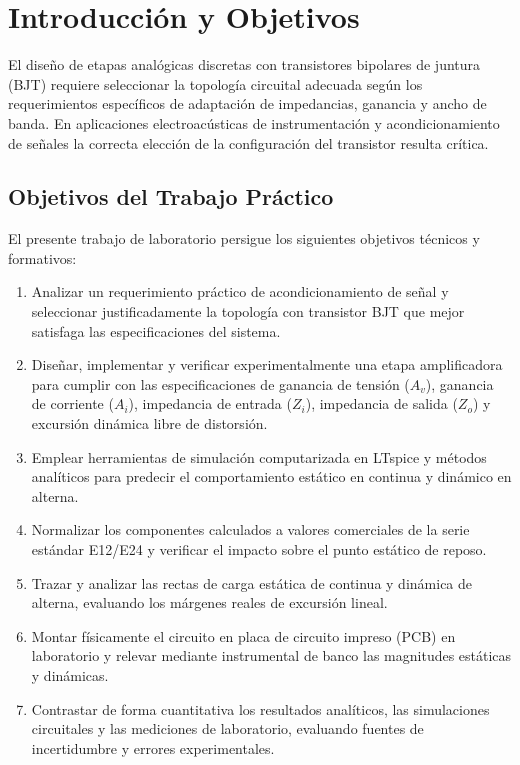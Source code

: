 \chapter{Introducción y Objetivos}
\label{chap:introduccion}
El diseño de etapas analógicas discretas con transistores bipolares de juntura (BJT) requiere seleccionar la
topología circuital adecuada según los requerimientos específicos de adaptación de impedancias, ganancia y
ancho de banda. En aplicaciones electroacústicas de instrumentación y acondicionamiento de señales la correcta elección de la configuración del transistor resulta crítica.

\section{Objetivos del Trabajo Práctico}

El presente trabajo de laboratorio persigue los siguientes objetivos técnicos y formativos:
\begin{enumerate}
  \item Analizar un requerimiento práctico de acondicionamiento de señal y seleccionar justificadamente la
    topología con transistor BJT que mejor satisfaga las especificaciones del sistema.
  \item Diseñar, implementar y verificar experimentalmente una etapa amplificadora para cumplir con las
    especificaciones de ganancia de tensión ($A_v$), ganancia de corriente ($A_i$), impedancia de entrada ($Z_i$),
    impedancia de salida ($Z_o$) y excursión dinámica libre de distorsión.
  \item Emplear herramientas de simulación computarizada en LTspice y métodos analíticos para predecir el
    comportamiento estático en continua y dinámico en alterna.
  \item Normalizar los componentes calculados a valores comerciales de la serie estándar E12/E24 y verificar el
    impacto sobre el punto estático de reposo.
  \item Trazar y analizar las rectas de carga estática de continua y dinámica de alterna, evaluando los márgenes
    reales de excursión lineal.
  \item Montar físicamente el circuito en placa de circuito impreso (PCB) en laboratorio y relevar mediante
    instrumental de banco las magnitudes estáticas y dinámicas.
  \item Contrastar de forma cuantitativa los resultados analíticos, las simulaciones circuitales y las mediciones
    de laboratorio, evaluando fuentes de incertidumbre y errores experimentales.
\end{enumerate}



